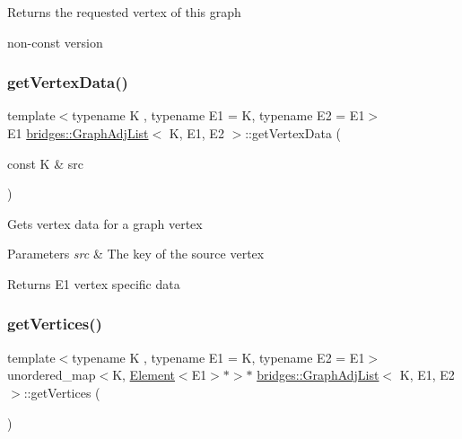 \begin{DoxyReturn}{Returns}
the requested vertex of this graph
\end{DoxyReturn}
non-\/const version \mbox{\label{classbridges_1_1_graph_adj_list_a2b419a910171cafac2b71ba9f8692e5e}} 
\subsubsection{\texorpdfstring{get\+Vertex\+Data()}{getVertexData()}}
{\footnotesize\ttfamily template$<$typename K , typename E1  = K, typename E2  = E1$>$ \\
E1 \mbox{\hyperlink{classbridges_1_1_graph_adj_list}{bridges\+::\+Graph\+Adj\+List}}$<$ K, E1, E2 $>$\+::get\+Vertex\+Data (\begin{DoxyParamCaption}\item[{const K \&}]{src }\end{DoxyParamCaption})\hspace{0.3cm}{\ttfamily [inline]}}

Gets vertex data for a graph vertex


\begin{DoxyParams}{Parameters}
{\em src} & The key of the source vertex\\
\hline
\end{DoxyParams}
\begin{DoxyReturn}{Returns}
E1 vertex specific data 
\end{DoxyReturn}
\mbox{\label{classbridges_1_1_graph_adj_list_a157c80e2bd439572f4f80e8850700297}} 
\subsubsection{\texorpdfstring{get\+Vertices()}{getVertices()}}
{\footnotesize\ttfamily template$<$typename K , typename E1  = K, typename E2  = E1$>$ \\
unordered\+\_\+map$<$K, \mbox{\hyperlink{classbridges_1_1_element}{Element}}$<$E1$>$$\ast$$>$$\ast$ \mbox{\hyperlink{classbridges_1_1_graph_adj_list}{bridges\+::\+Graph\+Adj\+List}}$<$ K, E1, E2 $>$\+::get\+Vertices (\begin{DoxyParamCaption}{ }\end{DoxyParamCaption})\hspace{0.3cm}{\ttfamily [inline]}}

